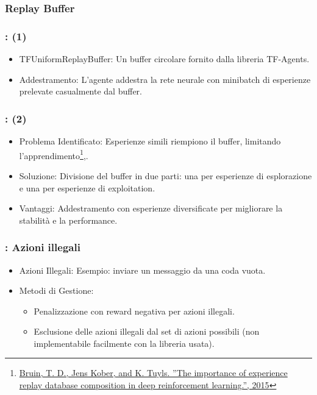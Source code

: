 \documentclass[compress]{beamer}
\begin{document}
\subsubsection{Replay Buffer}
\begin{frame}
    \frametitle{\subsecname: \subsubsecname (1)}
    \begin{itemize}
        \item TFUniformReplayBuffer: Un buffer circolare fornito dalla libreria TF-Agents.
        \item Addestramento: L'agente addestra la rete neurale con minibatch di esperienze prelevate casualmente dal buffer.
    \end{itemize}
\end{frame}

\begin{frame}
    \frametitle{\subsecname: \subsubsecname (2)}
    \begin{itemize}
        \item Problema Identificato: Esperienze simili riempiono il buffer, limitando l'apprendimento\footnote{\href{https://rll.berkeley.edu/deeprlworkshop/papers/database_composition.pdf}{ Bruin, T. D., Jens Kober, and K. Tuyls. ”The importance of experience replay database composition in deep reinforcement learning.”, 2015}},.
        \item Soluzione: Divisione del buffer in due parti: una per esperienze di esplorazione e una per esperienze di exploitation.
        \item Vantaggi: Addestramento con esperienze diversificate per migliorare la stabilità e la performance.
    \end{itemize}
\end{frame}

\begin{frame}
    \frametitle{\subsecname: Azioni illegali}
    \begin{itemize}
        \item Azioni Illegali: Esempio: inviare un messaggio da una coda vuota.
        \item Metodi di Gestione:
        \begin{itemize}
            \item Penalizzazione con reward negativa per azioni illegali.
            \item Esclusione delle azioni illegali dal set di azioni possibili (non implementabile facilmente con la libreria usata).
        \end{itemize}
    \end{itemize}
    \end{frame}
\end{document}
